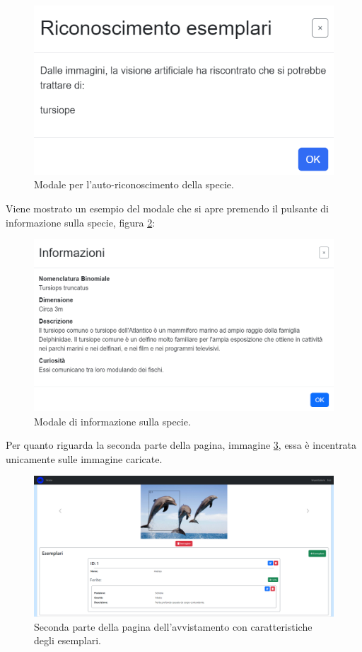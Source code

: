 \documentclass[a4paper,final,12pt]{report}
\begin{document}
\begin{figure}[hbtp]
\centering
\includegraphics[scale=0.65]{img_concettuale/autoric.png}
\caption{Modale per l'auto-riconoscimento della specie.}
\label{figura:modaleautoricwebpag}
\end{figure}
Viene mostrato un esempio del modale che si apre premendo il pulsante di informazione sulla specie, figura \ref{figura:modinfospec}:
\begin{figure}[hbtp]
\centering
\includegraphics[scale=0.45]{img_concettuale/avv123.png}
\caption{Modale di informazione sulla specie.}
\label{figura:modinfospec}
\end{figure}
\newpage
Per quanto riguarda la seconda parte della pagina, immagine \ref{figura:secondaparteapgavv}, essa è incentrata unicamente sulle immagine caricate.
\begin{figure}[hbtp]
\centering
\includegraphics[scale=0.31]{img_concettuale/avvistamentoPAG2.png}
\caption{Seconda parte della pagina dell'avvistamento con caratteristiche degli esemplari.}
\label{figura:secondaparteapgavv}
\end{figure}
\end{document}
